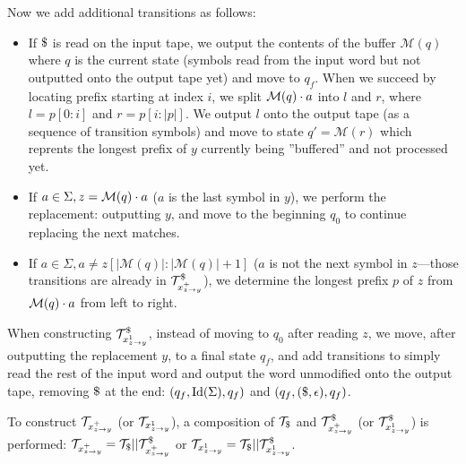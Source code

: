 Now we add additional transitions as follows:\newline
\begin{itemize}
  \item If $\marker$ is read on the input tape, we output the contents of the buffer $\mathcal{M}(q)$ where $q$ is the current state (symbols read from the input word but not outputted onto the output tape yet) and move to $q_f$.
  When we succeed by locating prefix starting at index $i$, we split $\mathcal{M}(q) \cdot a$ into $l$ and $r$, where $l = p[0:i]$ and $r = p[i:|p|]$.
  We output $l$ onto the output tape (as a sequence of transition symbols) and move to state $q' = \mathcal{M}(r)$ which reprents the longest prefix of $y$ currently being ''buffered'' and not processed yet.
  \item If $a \in \Sigma, z = \mathcal{M}(q) \cdot a$ ($a$ is the last symbol in $y$), we perform the replacement: outputting $y$, and move to the beginning $q_0$ to continue replacing the next matches.
  \item If $a \in \Sigma, a \neq z[|\mathcal{M}(q)|:|\mathcal{M}(q)| + 1]$ ($a$ is not the next symbol in $z$---those transitions are already in  $\mathcal{T}^\$_{x^{+}_{z \rightarrow y}}$), we determine the longest prefix $p$ of $z$ from $\mathcal{M}(q) \cdot a$ from left to right.
\end{itemize}

When constructing $\mathcal{T}^\$_{x^{1}_{z \rightarrow y}}$, instead of moving to $q_0$ after reading $z$, we move, after outputting the replacement $y$, to a final state $q_f$, and add transitions to simply read the rest of the input word and output the word unmodified onto the output tape, removing $\marker$ at the end: $(q_f, \text{Id}(\Sigma), q_f)$ and $(q_f, (\$, \epsilon), q_f)$.

To construct $\mathcal{T}_{x^{+}_{z \rightarrow y}}$ (or $\mathcal{T}_{x^{1}_{z \rightarrow y}}$), a composition of $\ft_\marker$ and $\mathcal{T}^\$_{x^{+}_{z \rightarrow y}}$ (or $\mathcal{T}^\$_{x^{1}_{z \rightarrow y}}$) is performed: $\mathcal{T}_{x^{+}_{z \rightarrow y}} = \mathcal{T}_\$ || \mathcal{T}^\$_{x^{+}_{z \rightarrow y}}$ or $\mathcal{T}_{x^{1}_{z \rightarrow y}} = \mathcal{T}_\$ || \mathcal{T}^\$_{x^{1}_{z \rightarrow y}}$.

